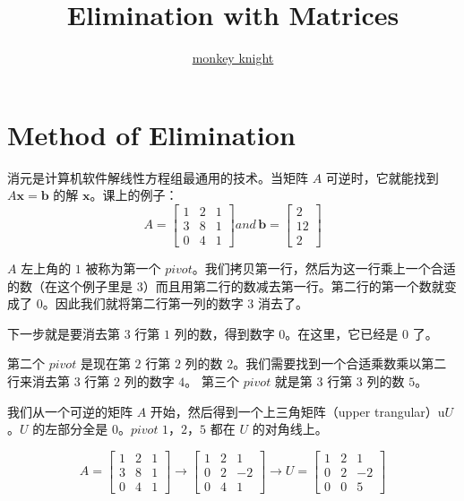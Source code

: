 \documentclass[green, cn, normal]{elegantnote}
\title{Elimination with Matrices}
\author{\href{https://monkey-knight.github.io/}{monkey knight}}
\begin{document}
	\maketitle
	
	\section{Method of Elimination}
	消元是计算机软件解线性方程组最通用的技术。当矩阵 $A$ 可逆时，它就能找到 $A\textbf{x} = \textbf{b}$ 的解 $\textbf{x}$。课上的例子：
	\[
	A = \begin{bmatrix}
	1 & 2 & 1 \\
	3 & 8 & 1 \\
	0 & 4 & 1
	\end{bmatrix} 
	and \,
	\textbf{b}= \begin{bmatrix}
	2 \\
	12 \\
	2
	\end{bmatrix}
	\]
	
	$A$ 左上角的 $1$ 被称为第一个 $pivot$。我们拷贝第一行，然后为这一行乘上一个合适的数（在这个例子里是 $3$）而且用第二行的数减去第一行。第二行的第一个数就变成了 $0$。因此我们就将第二行第一列的数字 $3$ 消去了。
	
	下一步就是要消去第 $3$ 行第 $1$ 列的数，得到数字 $0$。在这里，它已经是 $0$ 了。
	
	第二个 $pivot$ 是现在第 $2$ 行第 $2$ 列的数 $2$。我们需要找到一个合适乘数乘以第二行来消去第 $3$ 行第 $2$ 列的数字 $4$。 第三个 $pivot$ 就是第 $3$ 行第 $3$ 列的数 $5$。
	
	我们从一个可逆的矩阵 $A$ 开始，然后得到一个上三角矩阵（upper trangular）u$U$。$U$ 的左部分全是 $0$。$pivot$ $1$，$2$，$5$ 都在 $U$ 的对角线上。
	
	\[
	A = \begin{bmatrix}
	1 & 2 & 1 \\
	3 & 8 & 1 \\
	0 & 4 & 1
	\end{bmatrix}
	\rightarrow
	\begin{bmatrix}
	1 & 2 & 1 \\
	0 & 2 & -2 \\
	0 & 4 & 1
	\end{bmatrix}
	\rightarrow
	U = 
	\begin{bmatrix}
	1 & 2 & 1 \\
	0 & 2 & -2 \\
	0 & 0 & 5
	\end{bmatrix}
	\]
	
\end{document}

